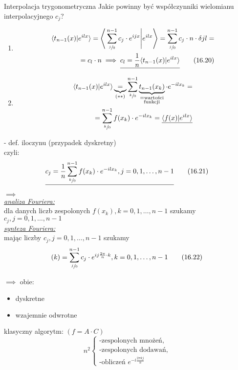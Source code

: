 \begin{frame}[allowframebreaks]{Interpolacja trygonometryczna}
	Jakie powinny być współczynniki wielomianu interpolacyjnego $c_j$?
	\begin{enumerate}[1$^\circ$]
		\item
		\begin{align*}
			\langle t_{n-1}(x)|e^{ilx} \rangle = \Bigg\langle \sum\limits_{\sfrac{j}{0}}^{n-1} c_j \cdot e^{ijx} \Bigg|e^{ilx} \Bigg\rangle = \sum\limits_{\sfrac{j}{0}}^{n-1} c_j \cdot n \cdot \delta jl = \\ = c_l \cdot n \implies \underline{c_l = \frac{1}{n} \langle t_{n-1}(x)|e^{ilx} \rangle}
			\tag{16.20}
		\end{align*}
		\item
		\begin{align*}
			\langle t_{n-1}(x)|e^{ilx} \rangle \underbrace{=}_{(**)} \sum\limits_{\sfrac{k}{0}}^{n-1}  \underbrace{t_{n-1}(x_k)}_{\substack{\text{=wartości} \\  \text{funkcji}}} \cdot e^{-ilx_k} = \\ = \sum\limits_{\sfrac{k}{0}}^{n-1} f(x_k) \cdot e^{-ilx_k} = \underline{\langle f(x)|e^{ilx} \rangle}
		\end{align*}
	\end{enumerate}
	- def. iloczynu (przypadek dyskretny) \\
	czyli:
	\[
		\underline{c_j = \frac{1}{n} \sum\limits_{\sfrac{k}{0}}^{n-1} f(x_k) \cdot e^{-ilx_k}, j = 0, 1, \dots, n-1}
		\tag{16.21}
	\]
	\begin{flushleft}
		$\implies$ \\
		\underline{\textit{analiza Fouriera:}} \\
		dla danych liczb zespolonych $f(x_k), k = 0, 1,\dots, n - 1$ szukamy $c_j, j = 0, 1, \dots, n-1$ \\
		\bigskip
		\underline{\textit{synteza Fouriera:}} \\
		mając liczby $c_j, j = 0, 1, \dots, n-1$ szukamy
		\[
			(k) = \sum\limits_{\sfrac{j}{0}}^{n - 1} c_j \cdot e^{ij\frac{2\pi}{n} \cdot k}, k = 0, 1, \dots, n-1
			\tag{16.22}
		\]
	\end{flushleft}
	\begin{flushleft}
		$\implies$ obie:
		\begin{itemize}
			\item dyskretne
			\item wzajemnie odwrotne
		\end{itemize}
		klasyczny algorytm: $(f = A \cdot C)$
		\[ n^2
		\begin{cases}
			\text{-zespolonych mnożeń,} \\
			\text{-zespolonych dodawań,} \\
			\text{-obliczeń } e^{-i\frac{2\pi kj}{n}}
		\end{cases}
		\tag{16.23}
		\]
	\end{flushleft}	
\end{frame}